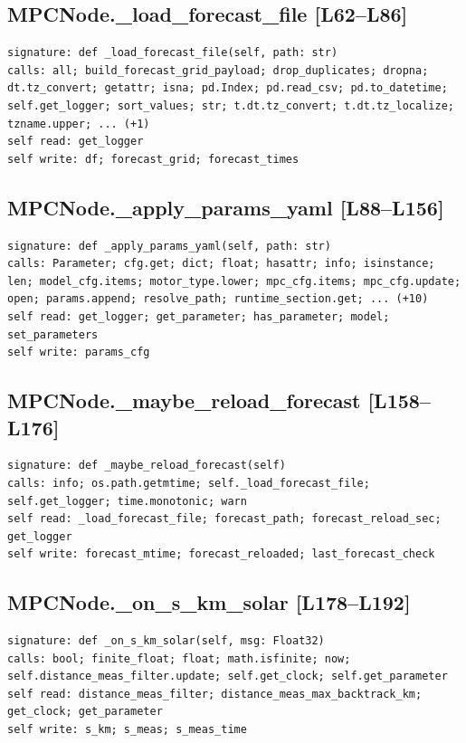 \documentclass[a4paper,10pt,oneside]{book}
\begin{document}
\subsection*{MPCNode.\_load\_forecast\_file [L62--L86]}
\begin{lstlisting}[numbers=none]
signature: def _load_forecast_file(self, path: str)
calls: all; build_forecast_grid_payload; drop_duplicates; dropna; dt.tz_convert; getattr; isna; pd.Index; pd.read_csv; pd.to_datetime; self.get_logger; sort_values; str; t.dt.tz_convert; t.dt.tz_localize; tzname.upper; ... (+1)
self read: get_logger
self write: df; forecast_grid; forecast_times
\end{lstlisting}
\subsection*{MPCNode.\_apply\_params\_yaml [L88--L156]}
\begin{lstlisting}[numbers=none]
signature: def _apply_params_yaml(self, path: str)
calls: Parameter; cfg.get; dict; float; hasattr; info; isinstance; len; model_cfg.items; motor_type.lower; mpc_cfg.items; mpc_cfg.update; open; params.append; resolve_path; runtime_section.get; ... (+10)
self read: get_logger; get_parameter; has_parameter; model; set_parameters
self write: params_cfg
\end{lstlisting}
\subsection*{MPCNode.\_maybe\_reload\_forecast [L158--L176]}
\begin{lstlisting}[numbers=none]
signature: def _maybe_reload_forecast(self)
calls: info; os.path.getmtime; self._load_forecast_file; self.get_logger; time.monotonic; warn
self read: _load_forecast_file; forecast_path; forecast_reload_sec; get_logger
self write: forecast_mtime; forecast_reloaded; last_forecast_check
\end{lstlisting}
\subsection*{MPCNode.\_on\_s\_km\_solar [L178--L192]}
\begin{lstlisting}[numbers=none]
signature: def _on_s_km_solar(self, msg: Float32)
calls: bool; finite_float; float; math.isfinite; now; self.distance_meas_filter.update; self.get_clock; self.get_parameter
self read: distance_meas_filter; distance_meas_max_backtrack_km; get_clock; get_parameter
self write: s_km; s_meas; s_meas_time
\end{lstlisting}
\end{document}
